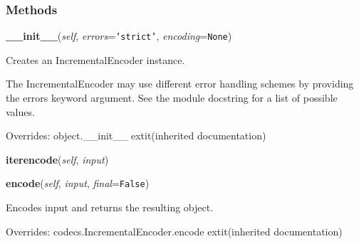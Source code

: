 
  \subsubsection{Methods}

    \vspace{0.5ex}

\hspace{.8\funcindent}\begin{boxedminipage}{\funcwidth}

    \raggedright \textbf{\_\_init\_\_}(\textit{self}, \textit{errors}={\tt \texttt{'}\texttt{strict}\texttt{'}}, \textit{encoding}={\tt None})

\setlength{\parskip}{2ex}
    Creates an IncrementalEncoder instance.

    The IncrementalEncoder may use different error handling schemes by 
    providing the errors keyword argument. See the module docstring for a 
    list of possible values.

\setlength{\parskip}{1ex}
      Overrides: object.\_\_init\_\_ 	extit{(inherited documentation)}

    \end{boxedminipage}

    \label{cssutils:codec:IncrementalEncoder:iterencode}

    \vspace{0.5ex}

\hspace{.8\funcindent}\begin{boxedminipage}{\funcwidth}

    \raggedright \textbf{iterencode}(\textit{self}, \textit{input})

\setlength{\parskip}{2ex}
\setlength{\parskip}{1ex}
    \end{boxedminipage}

    \vspace{0.5ex}

\hspace{.8\funcindent}\begin{boxedminipage}{\funcwidth}

    \raggedright \textbf{encode}(\textit{self}, \textit{input}, \textit{final}={\tt False})

\setlength{\parskip}{2ex}
    Encodes input and returns the resulting object.

\setlength{\parskip}{1ex}
      Overrides: codecs.IncrementalEncoder.encode 	extit{(inherited documentation)}

    \end{boxedminipage}

